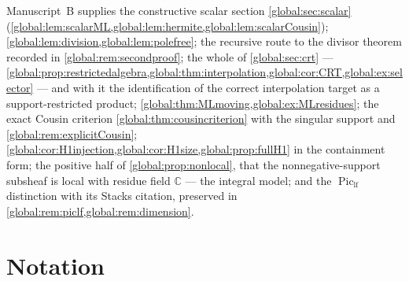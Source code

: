 \documentclass[11pt,letterpaper]{article}
\theoremstyle{definition}
\theoremstyle{remark}
\newcommand{\C}{\mathbb C}
\newcommand{\Piclf}{\operatorname{Pic}_{\mathrm{lf}}}
\numberwithin{equation}{section}
\begin{document}
Manuscript~B supplies the constructive scalar section \cref{global:sec:scalar} (\cref{global:lem:scalarML,global:lem:hermite,global:lem:scalarCousin}); \cref{global:lem:division,global:lem:polefree}; the recursive route to the divisor theorem recorded in \cref{global:rem:secondproof}; the whole of \cref{global:sec:crt} --- \cref{global:prop:restrictedalgebra,global:thm:interpolation,global:cor:CRT,global:ex:selector} --- and with it the identification of the correct interpolation target as a support-restricted product; \cref{global:thm:MLmoving,global:ex:MLresidues}; the exact Cousin criterion \cref{global:thm:cousincriterion} with the singular support and \cref{global:rem:explicitCousin}; \cref{global:cor:H1injection,global:cor:H1size,global:prop:fullH1} in the containment form; the positive half of \cref{global:prop:nonlocal}, that the nonnegative-support subsheaf is local with residue field $\C$ --- the integral model; and the $\Piclf$ distinction with its Stacks citation, preserved in \cref{global:rem:piclf,global:rem:dimension}.

\section{Notation}\label{global:app:notation}
\end{document}
